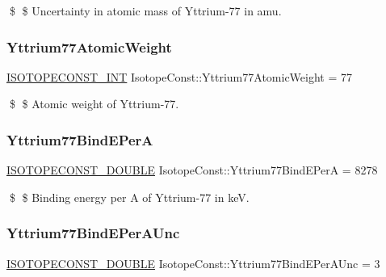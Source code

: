 \$ \$ Uncertainty in atomic mass of Yttrium-\/77 in amu. \mbox{\label{group___isotope_const-_yttrium-_y77_ga6f65736c26bd58e526c51975f538ddd0}} 
\subsubsection{\texorpdfstring{Yttrium77\+Atomic\+Weight}{Yttrium77AtomicWeight}}
{\footnotesize\ttfamily \mbox{\hyperlink{group___isotope_const-_macros_ga5f18360b3e99483a35c32d789e62621c}{I\+S\+O\+T\+O\+P\+E\+C\+O\+N\+S\+T\+\_\+\+I\+NT}} Isotope\+Const\+::\+Yttrium77\+Atomic\+Weight = 77}

\$ \$ Atomic weight of Yttrium-\/77. \mbox{\label{group___isotope_const-_yttrium-_y77_ga4774b8037f9957305cc32aefd0bb6b93}} 
\subsubsection{\texorpdfstring{Yttrium77\+Bind\+E\+PerA}{Yttrium77BindEPerA}}
{\footnotesize\ttfamily \mbox{\hyperlink{group___isotope_const-_macros_ga8f45a7272ce02c0b4c65c44636ed719a}{I\+S\+O\+T\+O\+P\+E\+C\+O\+N\+S\+T\+\_\+\+D\+O\+U\+B\+LE}} Isotope\+Const\+::\+Yttrium77\+Bind\+E\+PerA = 8278}

\$ \$ Binding energy per A of Yttrium-\/77 in keV. \mbox{\label{group___isotope_const-_yttrium-_y77_ga8db3095ebedc6255a3c0d54aa2c833a0}} 
\subsubsection{\texorpdfstring{Yttrium77\+Bind\+E\+Per\+A\+Unc}{Yttrium77BindEPerAUnc}}
{\footnotesize\ttfamily \mbox{\hyperlink{group___isotope_const-_macros_ga8f45a7272ce02c0b4c65c44636ed719a}{I\+S\+O\+T\+O\+P\+E\+C\+O\+N\+S\+T\+\_\+\+D\+O\+U\+B\+LE}} Isotope\+Const\+::\+Yttrium77\+Bind\+E\+Per\+A\+Unc = 3}

